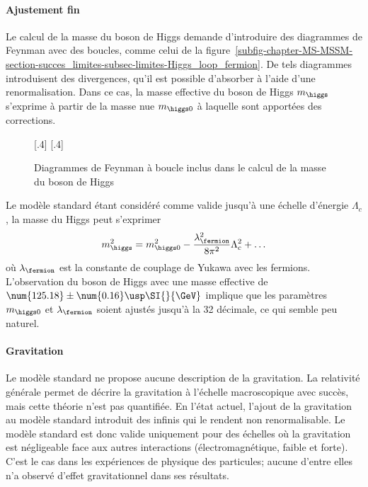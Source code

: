\paragraph{Ajustement fin}
Le calcul de la masse du boson de Higgs demande d'introduire des diagrammes de Feynman avec des boucles, comme celui de la figure~\ref{subfig-chapter-MS-MSSM-section-succes_limites-subsec-limites-Higgs_loop_fermion}.
De tels diagrammes introduisent des divergences, qu'il est possible d'absorber à l'aide d'une renormalisation.
Dans ce cas, la masse effective du boson de Higgs $m_{\higgs}$ s'exprime à partir de la masse \og nue \fg{} $m_{\higgs 0}$ à laquelle sont apportées des corrections.
\begin{figure}[h]
\centering
{}[.4\textwidth]
{}
\qquad\qquad
{}[.4\textwidth]
{}

\caption{Diagrammes de Feynman à boucle inclus dans le calcul de la masse du boson de Higgs}
\label{fig-chapter-MS-MSSM-section-succes_limites-subsec-limites-Higgs_loops}
\end{figure}
\par Le modèle standard étant considéré comme valide jusqu'à une échelle d'énergie $\Lambda_c$, la masse du Higgs peut s'exprimer
\begin{equation}
m_{\higgs}^2 = m_{\higgs 0}^2 - \frac{\lambda_{\fermion}^2}{8\pi^2} \Lambda_c^2 + \ldots
\end{equation}
où $\lambda_{\fermion}$ est la constante de couplage de Yukawa avec les fermions.
L'observation du boson de Higgs avec une masse effective de $\num{125.18}\pm\num{0.16}\usp\SI{}{\GeV}$ implique que les paramètres $ m_{\higgs 0}$ et $\lambda_{\fermion}$ soient ajustés jusqu'à la 32 décimale, ce qui semble peu naturel.
\paragraph{Gravitation}
Le modèle standard ne propose aucune description de la gravitation.
La relativité générale permet de décrire la gravitation à l'échelle macroscopique avec succès, mais cette théorie n'est pas quantifiée.
En l'état actuel, l'ajout de la gravitation au modèle standard introduit des infinis qui le rendent non renormalisable.
Le modèle standard est donc valide uniquement pour des échelles où la gravitation est négligeable face aux autres interactions (électromagnétique, faible et forte).
C'est le cas dans les expériences de physique des particules; aucune d'entre elles n'a observé d'effet gravitationnel dans ses résultats.
